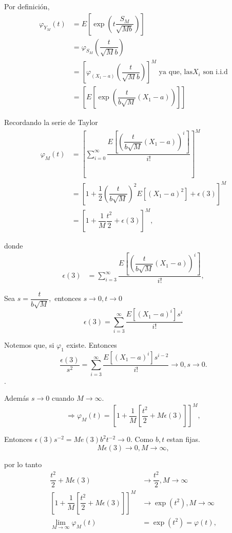 \documentclass[
  letterpaper,
  DIV=11,
  numbers=noendperiod]{scrreprt}
\begin{document}
Por definición, \begin{align*}
\varphi_{Y_{M}}\left(t\right) & =E\left[\exp\left(t\dfrac{S_{M}}{\sqrt{Mb}}\right)\right]\\
& =\varphi_{S_M}\left(\dfrac{t}{\sqrt{M}b}\right)\\
& =\left[\varphi_{\left(X_{1}-a\right)}\left(\dfrac{t}{\sqrt{M}b}\right)\right]^{M} \text{ ya que, las}X_{i}\text{ son i.i.d}\\
& =\left[E\left[\exp\left(\dfrac{t}{b\sqrt{M}}\left(X_{1}-a\right)\right)\right]\right]
\end{align*}

Recordando la serie de Taylor \begin{align*}
\varphi_{M}\left(t\right) & =\left[\sum_{i=0}^{\infty}\dfrac{E\left[\left(\dfrac{t}{b\sqrt{M}}\left(X_{1}-a\right)\right)^{i}\right]}{i!}\right]^{M}\\
& =\left[1+\dfrac{1}{2}\left(\dfrac{t}{b\sqrt{M}}\right)^{2}E\left[\left(X_{1}-a\right)^{2}\right]+\epsilon\left(3\right)\right]^{M}\\
& =\left[1+\dfrac{1}{M}\dfrac{t^{2}}{2}+\epsilon\left(3\right)\right]^{M},
\end{align*}

donde \begin{align*}
\epsilon\left(3\right) & =\sum_{i=3}^{\infty}\dfrac{E\left[\left(\dfrac{t}{b\sqrt{M}}\left(X_{1}-a\right)\right)^{i}\right]}{i!},
\end{align*}

Sea \(s=\dfrac{t}{b\sqrt{M}},\) entonces \(s\to0,t\to0\) \[
\epsilon\left(3\right)=\sum_{i=3}^{\infty}\dfrac{E\left[\left(X_{1}-a\right)^{i}\right]s^{i}}{i!}
\]

Notemos que, si \(\varphi_{1}\) existe. Entonces \[
\dfrac{\epsilon\left(3\right)}{s^{2}}=\sum_{i=3}^{\infty}\dfrac{E\left[\left(X_{1}-a\right)^{i}\right]s^{i-2}}{i!}\to0,s\to0.
\] .

Además \(s\to0\) cuando \(M\to\infty\). \[
\Rightarrow\varphi_{M}\left(t\right)=\left[1+\dfrac{1}{M}\left[\dfrac{t^{2}}{2}+M\epsilon\left(3\right)\right]\right]^{M},
\]

Entonces
\(\epsilon\left(3\right)s^{-2}=Me\left(3\right)b^{2}t^{-2}\to0\). Como
\(b,t\) estan fijas. \[
M\epsilon\left(3\right)\to0,M\to\infty,
\]

por lo tanto \begin{align*}
\dfrac{t^{2}}{2}+M\epsilon\left(3\right) & \to\dfrac{t^{2}}{2},M\to\infty\\
\left[1+\dfrac{1}{M}\left[\dfrac{t^{2}}{2}+M\epsilon\left(3\right)\right]\right]^{M} & \to\exp\left(t^{2}\right),M\to\infty\\
\lim_{M\to\infty}\varphi_{M}\left(t\right) & =\exp\left(t^{2}\right)=\varphi\left(t\right),
\end{align*}
\end{document}
